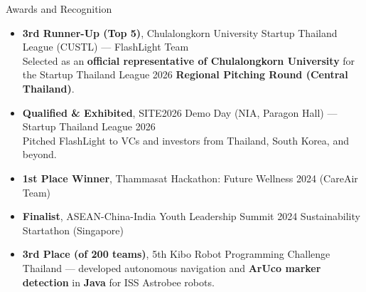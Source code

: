 \documentclass[11pt]{resume} %
\begin{document}
\begin{rSection}{Awards and Recognition}
    \begin{itemize}
        \item \textbf{3rd Runner-Up (Top 5)}, Chulalongkorn University Startup Thailand League (CUSTL) --- FlashLight Team \\[-0.4ex]
        Selected as an \textbf{official representative of Chulalongkorn University} for the Startup Thailand League 2026 \textbf{Regional Pitching Round (Central Thailand)}.
        \item \textbf{Qualified \& Exhibited}, SITE2026 Demo Day (NIA, Paragon Hall) --- Startup Thailand League 2026 \\[-0.4ex]
        Pitched FlashLight to VCs and investors from Thailand, South Korea, and beyond.
        \item \textbf{1st Place Winner}, Thammasat Hackathon: Future Wellness 2024 (CareAir Team)
        \item \textbf{Finalist}, ASEAN-China-India Youth Leadership Summit 2024 Sustainability Startathon (Singapore)
        \item \textbf{3rd Place (of 200 teams)}, 5th Kibo Robot Programming Challenge Thailand --- developed autonomous navigation and \textbf{ArUco marker detection} in \textbf{Java} for ISS Astrobee robots.
    \end{itemize}
\end{rSection}
\end{document}
